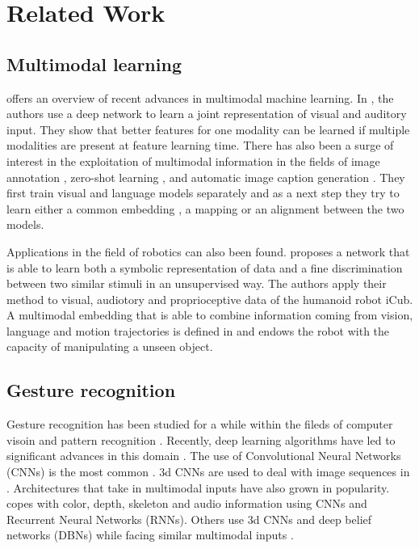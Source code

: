 \section{Related Work} \label{section:related}

\subsection{Multimodal learning}

\cite{T. Baltrusaitis 2017} offers an overview of recent advances in
multimodal machine learning. In \cite{J. Ngiam 2011}, the authors
use a deep network to learn a joint representation of visual and auditory
input. They show that better features for one modality can be learned if
multiple modalities are present at feature learning time. 
There has also been a surge of interest in the exploitation of multimodal
information in the fields of image annotation \cite{J. Weston 2010},
zero-shot learning \cite{A. Frome 2013, R. Socher 2013}, and automatic
image caption generation \cite{A. Karpathy 2015}. They first train
visual and language models separately and as a next step they try
to learn either a common embedding \cite{J. Weston 2010}, a mapping
\cite{A. Frome 2013, R. Socher 2013} or an alignment \cite{A. Karpathy 2015}
between the two models.

Applications in the field of robotics can also been found.
\cite{A. Droniou 2014} proposes a network that is able to learn both
a symbolic representation of data and a fine discrimination between
two similar stimuli in an unsupervised way. The authors apply their method
to visual, audiotory and proprioceptive data of the humanoid robot iCub.
A multimodal embedding that is able to combine information coming from
vision, language and motion trajectories is defined in \cite{J. Sung 2017}
and endows the robot with the capacity of manipulating a unseen object.

\subsection{Gesture recognition}

Gesture recognition has been studied for a while within the fileds of
computer visoin and pattern recognition
\cite{T. Starner 1998, S. Mitra 2007}.
Recently, deep learning algorithms have led to
significant advances in this domain \cite{M. Asadi-Aghbolaghi 2017}.
The use of Convolutional Neural Networks (CNNs) is the most common
\cite{J. Nagi 2011}. 3d CNNs are used to deal with image sequences in
\cite{P. Molchanov 2015}. Architectures that take in multimodal inputs
have also grown in popularity. \cite{N. Neverova 2013} copes with color,
depth, skeleton and audio information using CNNs and Recurrent
Neural Networks (RNNs). Others use 3d CNNs and deep belief networks
(DBNs) while facing similar multimodal inputs
\cite{N. Neverova 2014, L. Pigou 2014, D. Wu 2016}.

